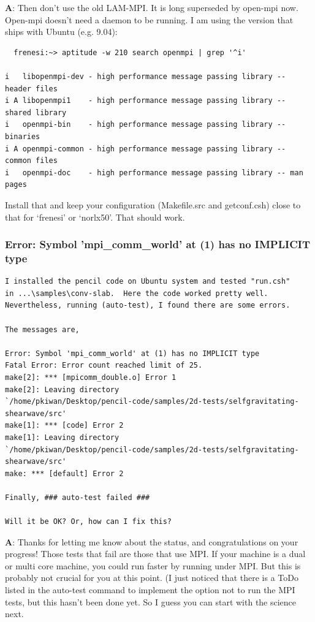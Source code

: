 \documentclass[\mydriver,12pt,twoside,notitlepage,a4paper]{article}
\begin{document}
\medskip

{\bf A}: Then don't use the old LAM-MPI. It is long superseded by open-mpi now.
Open-mpi doesn't need a daemon to be running. I am using the version that
ships with Ubuntu (e.g. 9.04):

\begin{Verbatim}
  frenesi:~> aptitude -w 210 search openmpi | grep '^i'

i   libopenmpi-dev - high performance message passing library -- header files
i A libopenmpi1    - high performance message passing library -- shared library
i   openmpi-bin    - high performance message passing library -- binaries
i A openmpi-common - high performance message passing library -- common files
i   openmpi-doc    - high performance message passing library -- man pages
\end{Verbatim}

Install that and keep your configuration (Makefile.src and getconf.csh)
close to that for `frenesi' or `norlx50'. That should work.

\subsubsection{Error: Symbol 'mpi_comm_world' at (1) has no IMPLICIT type}

\begin{Verbatim}
I installed the pencil code on Ubuntu system and tested "run.csh"
in ...\samples\conv-slab.  Here the code worked pretty well.
Nevertheless, running (auto-test), I found there are some errors.

The messages are,

Error: Symbol 'mpi_comm_world' at (1) has no IMPLICIT type
Fatal Error: Error count reached limit of 25.
make[2]: *** [mpicomm_double.o] Error 1
make[2]: Leaving directory
`/home/pkiwan/Desktop/pencil-code/samples/2d-tests/selfgravitating-shearwave/src'
make[1]: *** [code] Error 2
make[1]: Leaving directory
`/home/pkiwan/Desktop/pencil-code/samples/2d-tests/selfgravitating-shearwave/src'
make: *** [default] Error 2

Finally, ### auto-test failed ###

Will it be OK? Or, how can I fix this?
\end{Verbatim}

\medskip

{\bf A}: Thanks for letting me know about the status, and congratulations
on your progress! Those tests that fail are those that use MPI.
If your machine is a dual or multi core machine, you could run
faster by running under MPI. But this is probably not crucial for
you at this point. (I just noticed that there is a ToDo listed
in the auto-test command to implement the option not to run the
MPI tests, but this hasn't been done yet. So I guess you can start
with the science next.
\end{document}
